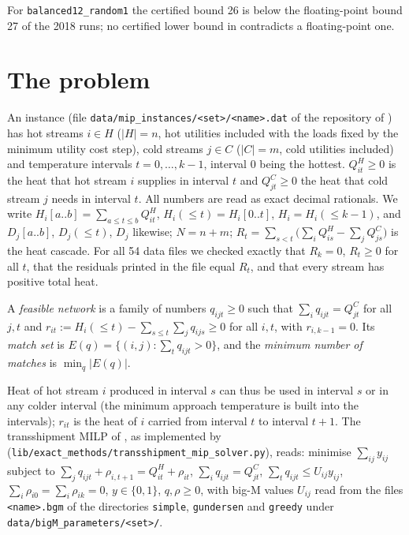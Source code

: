\documentclass[11pt,a4paper]{report}
\newcommand*{\inst}[1]{\texttt{#1}}
\begin{document}
For \inst{balanced12\_random1} the certified bound 26 is below the floating-point bound 27 of the 2018 runs; no
certified lower bound in  contradicts a floating-point one.

\section{The problem}

An instance (file \texttt{data/mip\_instances/<set>/<name>.dat} of the repository of \textcite{LKM2018}) has hot
streams $i\in H$ ($|H|=n$, hot utilities included with the loads fixed by the minimum utility cost step), cold
streams $j\in C$ ($|C|=m$, cold utilities included) and temperature intervals $t=0,\dots,k-1$, interval $0$ being
the hottest. $Q^H_{it}\ge0$ is the heat that hot stream $i$ supplies in interval $t$ and $Q^C_{jt}\ge0$ the heat that
cold stream $j$ needs in interval $t$. All numbers are read as exact decimal rationals. We write
$H_i[a..b]=\sum_{a\le t\le b}Q^H_{it}$, $H_i({\le}t)=H_i[0..t]$, $H_i=H_i({\le}k{-}1)$, and $D_j[a..b]$,
$D_j({\le}t)$, $D_j$ likewise; $N=n+m$; $R_t=\sum_{s<t}\bigl(\sum_iQ^H_{is}-\sum_jQ^C_{js}\bigr)$ is the heat cascade.
For all 54 data files we checked exactly that $R_k=0$, $R_t\ge0$ for all $t$, that the residuals printed in the file
equal $R_t$, and that every stream has positive total heat.

\begin{definition}\label{def:network}
A \emph{feasible network} is a family of numbers $q_{ijt}\ge0$ such that $\sum_iq_{ijt}=Q^C_{jt}$ for all $j,t$ and
$r_{it}:=H_i({\le}t)-\sum_{s\le t}\sum_jq_{ijs}\ge0$ for all $i,t$, with $r_{i,k-1}=0$. Its \emph{match set} is
$E(q)=\{(i,j):\sum_tq_{ijt}>0\}$, and the \emph{minimum number of matches} is $\min_q|E(q)|$.
\end{definition}

Heat of hot stream $i$ produced in interval $s$ can thus be used in interval $s$ or in any colder interval (the
minimum approach temperature is built into the intervals); $r_{it}$ is the heat of $i$ carried from interval $t$ to
interval $t+1$. The transshipment MILP of \textcite{PapouliasGrossmann1983}, as implemented by \textcite{LKM2018}
(\texttt{lib/exact\_methods/transshipment\_mip\_solver.py}), reads: minimise $\sum_{ij}y_{ij}$ subject to
$\sum_jq_{ijt}+\rho_{i,t+1}=Q^H_{it}+\rho_{it}$, $\sum_iq_{ijt}=Q^C_{jt}$, $\sum_tq_{ijt}\le U_{ij}y_{ij}$,
$\sum_i\rho_{i0}=\sum_i\rho_{ik}=0$, $y\in\{0,1\}$, $q,\rho\ge0$, with big-M values $U_{ij}$ read from the
files \texttt{<name>.bgm} of the directories \texttt{simple}, \texttt{gundersen} and \texttt{greedy} under
\texttt{data/bigM\_parameters/<set>/}.
\end{document}
